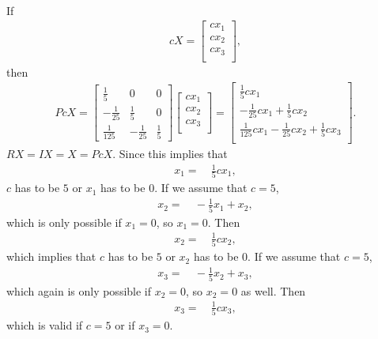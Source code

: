 \documentclass[12pt]{article}
\begin{document}
\begin{enumerate}
\begin{align*}
    \end{align*}
    If
    \begin{align*}
      cX =
      \begin{bmatrix}
        cx_1\\
        cx_2\\
        cx_3\\
      \end{bmatrix},
    \end{align*}
    then
    \begin{align*}
      PcX =
      \begin{bmatrix}
        \frac{1}{5} & 0 & 0\\
        -\frac{1}{25} & \frac{1}{5} & 0\\
        \frac{1}{125} & -\frac{1}{25} & \frac{1}{5}
      \end{bmatrix}
      \begin{bmatrix}
        cx_1\\
        cx_2\\
        cx_3\\
      \end{bmatrix}
      =
      \begin{bmatrix}
        \frac{1}{5}cx_1\\
        -\frac{1}{25}cx_1+\frac{1}{5}cx_2\\
        \frac{1}{125}cx_1-\frac{1}{25}cx_2+\frac{1}{5}cx_3\\
      \end{bmatrix}.
    \end{align*}
    $RX = IX = X = PcX$. Since this implies that
    \begin{align*}
      x_1 =&\ \frac{1}{5}cx_1,
    \end{align*}
    $c$ has to be $5$ or $x_1$ has to be $0$. If we assume that
    $c = 5$,
    \begin{align*}
      x_2 =&\ -\frac{1}{5}x_1 + x_2,
    \end{align*}
    which is only possible if $x_1 = 0$, so $x_1 = 0$. Then
    \begin{align*}
      x_2 =&\ \frac{1}{5}cx_2,
    \end{align*}
    which implies that $c$ has to be $5$ or $x_2$ has to be $0$.
    If we assume that $c = 5$,
    \begin{align*}
      x_3 =&\ -\frac{1}{5}x_2 + x_3,
    \end{align*}
    which again is only possible if $x_2 = 0$, so $x_2 = 0$ as
    well. Then
    \begin{align*}
      x_3 =&\ \frac{1}{5}cx_3,
    \end{align*}
    which is valid if $c = 5$ or if $x_3 = 0$.


\end{enumerate}
\end{document}

